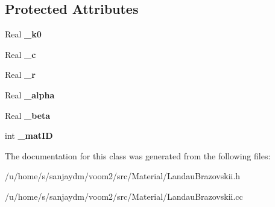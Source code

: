 \subsection*{Protected Attributes}
\begin{DoxyCompactItemize}
\item 
\hypertarget{classvoom_1_1_landau_brazovskii_adaf6b1a22b6a7856b8629669afdba00f}{
Real {\bfseries \_\-k0}}
\label{classvoom_1_1_landau_brazovskii_adaf6b1a22b6a7856b8629669afdba00f}

\item 
\hypertarget{classvoom_1_1_landau_brazovskii_ab030f2023500b51490589ea578f1bcc1}{
Real {\bfseries \_\-c}}
\label{classvoom_1_1_landau_brazovskii_ab030f2023500b51490589ea578f1bcc1}

\item 
\hypertarget{classvoom_1_1_landau_brazovskii_a59930b14c1cfe47ac9cc9149602c2a9f}{
Real {\bfseries \_\-r}}
\label{classvoom_1_1_landau_brazovskii_a59930b14c1cfe47ac9cc9149602c2a9f}

\item 
\hypertarget{classvoom_1_1_landau_brazovskii_aef65de5a5e66ecd23dd580b73b8d684c}{
Real {\bfseries \_\-alpha}}
\label{classvoom_1_1_landau_brazovskii_aef65de5a5e66ecd23dd580b73b8d684c}

\item 
\hypertarget{classvoom_1_1_landau_brazovskii_ac978bd172cd68f620aafcfb11a17b9c1}{
Real {\bfseries \_\-beta}}
\label{classvoom_1_1_landau_brazovskii_ac978bd172cd68f620aafcfb11a17b9c1}

\item 
\hypertarget{classvoom_1_1_landau_brazovskii_a2b562036daa953df26db083c16c9c8d2}{
int {\bfseries \_\-matID}}
\label{classvoom_1_1_landau_brazovskii_a2b562036daa953df26db083c16c9c8d2}

\end{DoxyCompactItemize}


The documentation for this class was generated from the following files:\begin{DoxyCompactItemize}
\item 
/u/home/s/sanjaydm/voom2/src/Material/LandauBrazovskii.h\item 
/u/home/s/sanjaydm/voom2/src/Material/LandauBrazovskii.cc\end{DoxyCompactItemize}

